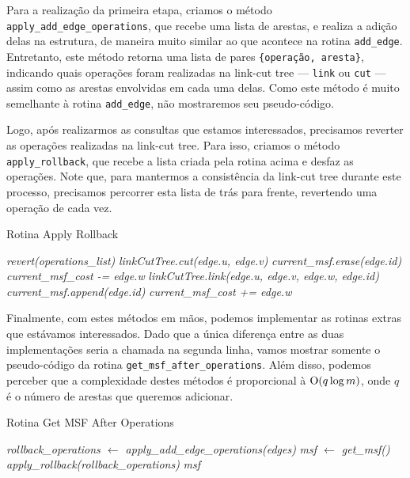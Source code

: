 Para a realização da primeira etapa, criamos o método \texttt{apply\_add\_edge\_operations}, que recebe uma lista de arestas, e realiza a adição delas na estrutura, de maneira muito similar ao que acontece na rotina \texttt{add\_edge}. Entretanto, este método retorna uma lista de pares \texttt{\{operação, aresta\}}, indicando quais operações foram realizadas na link-cut tree --- \texttt{link} ou \texttt{cut} --- assim como as arestas envolvidas em cada uma delas. Como este método é muito semelhante à rotina \texttt{add\_edge}, não mostraremos seu pseudo-código.

Logo, após realizarmos as consultas que estamos interessados, precisamos reverter as operações realizadas na link-cut tree. Para isso, criamos o método \texttt{apply\_rollback}, que recebe a lista criada pela rotina acima e desfaz as operações. Note que, para mantermos a consistência da link-cut tree durante este processo, precisamos percorrer esta lista de trás para frente, revertendo uma operação de cada vez.

\begin{algorithm}[h!]
    \caption{Rotina Apply Rollback}\label{imsf-apply-rollback}
    \begin{algorithmic}
        \State \emph{revert(operations\_list)}
        \State \emph{linkCutTree.cut(edge.u, edge.v)}
        \State \emph{current\_msf.erase(edge.id)}
        \State \emph{current\_msf\_cost -= edge.w}
        \Else
        \State \emph{linkCutTree.link(edge.u, edge.v, edge.w, edge.id)}
        \State \emph{current\_msf.append(edge.id)}
        \State \emph{current\_msf\_cost += edge.w}
        \EndIf
        \EndFor
        \EndFunction
    \end{algorithmic}
\end{algorithm}

Finalmente, com estes métodos em mãos, podemos implementar as rotinas extras que estávamos interessados. Dado que a única diferença entre as duas implementações seria a chamada na segunda linha, vamos mostrar somente o pseudo-código da rotina \texttt{get\_msf\_after\_operations}. Além disso, podemos perceber que a complexidade destes métodos é proporcional à $\mathrm{O}(q \log m)$, onde $q$ é o número de arestas que queremos adicionar.

\begin{algorithm}[h!]
    \caption{Rotina Get MSF After Operations}\label{imsf-msf-after}
    \begin{algorithmic}
        \State \emph{rollback\_operations $\gets$ apply\_add\_edge\_operations(edges)}
        \State \emph{msf $\gets$ get\_msf()}
        \State \emph{apply\_rollback(rollback\_operations)}
        \State \Return \emph{msf}
        \EndFunction
    \end{algorithmic}
\end{algorithm}

